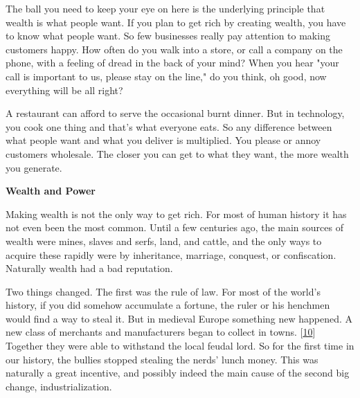 The ball you need to keep your eye on
                    here is the underlying principle that wealth is what people
                    want. If you plan to get rich by creating wealth, you have
                    to know what people want. So few businesses really pay
                    attention to making customers happy. How often do you walk
                    into a store, or call a company on the phone, with a feeling
                    of dread in the back of your mind? When you hear "your call
                    is important to us, please stay on the line," do you think,
                    oh good, now everything will be all right?

A
                    restaurant can afford to serve the occasional burnt dinner.
                    But in technology, you cook one thing and that's what
                    everyone eats. So any difference between what people want
                    and what you deliver is multiplied. You please or annoy
                    customers wholesale. The closer you can get to what they
                    want, the more wealth you generate.

\textbf{Wealth and Power}

Making wealth is not the only way to get rich.
                    For most of human history it has not even been the most
                    common. Until a few centuries ago, the main sources of
                    wealth were mines, slaves and serfs, land, and cattle, and
                    the only ways to acquire these rapidly were by inheritance,
                    marriage, conquest, or confiscation. Naturally wealth had a
                    bad reputation.

Two things changed. The first was
                    the rule of law. For most of the world's history, if you did
                    somehow accumulate a fortune, the ruler or his henchmen
                    would find a way to steal it. But in medieval Europe
                    something new happened. A new class of merchants and
                    manufacturers began to collect in towns.
                    [\href{\#f10n}{10}]
                    Together they were able to withstand the local feudal lord.
                    So for the first time in our history, the bullies stopped
                    stealing the nerds' lunch money. This was naturally a great
                    incentive, and possibly indeed the main cause of the second
                    big change, industrialization.

